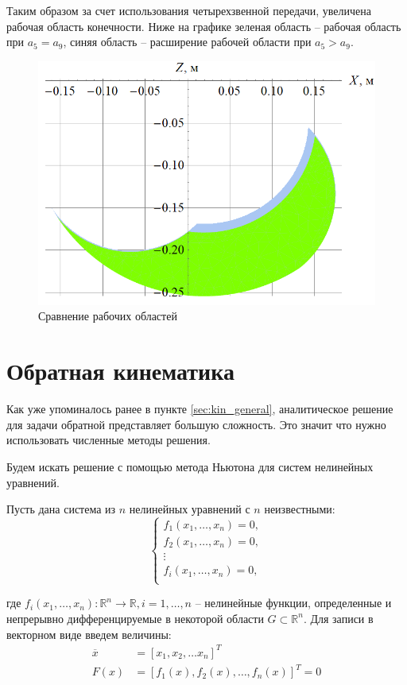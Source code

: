 Таким образом за счет использования четырехзвенной передачи, увеличена рабочая область конечности. Ниже на графике зеленая область -- рабочая область при $ a_5 = a_9 $, синяя область -- расширение рабочей области при $ a_5 > a_9 $.
\begin{figure}[h]
    \centering
    \includegraphics[scale=0.8]{chapter_kinematics/figure7.png}
    \caption{Сравнение рабочих областей}
    \label{}
\end{figure}

\section{Обратная кинематика} \label{sec:inverse_kin}
Как уже упоминалось ранее в пункте \ref{sec:kin_general}, аналитическое решение для задачи обратной представляет большую сложность. Это значит что нужно использовать численные методы решения.

Будем искать решение с помощью метода Ньютона для систем нелинейных уравнений.

Пусть дана система из $ n $ нелинейных уравнений с $ n $ неизвестными:
\[
\left\{ 
\begin{array}{c}
    f_1(x_1, \dots, x_n) = 0, \\
    f_2(x_1, \dots, x_n) = 0, \\
    \vdots \\
    f_i(x_1, \dots, x_n) = 0, \\
\end{array} 
\right.
\]

\noindent где $ f_i(x_1,\dots,x_n): \mathbb{R}^n \rightarrow \mathbb{R}, i=1,\dots, n $ -- нелинейные функции, определенные и непрерывно дифференцируемые в некоторой области $ G \subset \mathbb{R}^n $. Для записи в векторном виде введем величины:
\begin{align*}
    \overline{x} &= [x_1, x_2, \dots x_n]^T \\
    F(x) &= [f_1(x), f_2(x),\dots,f_n(x)]^T = 0
\end{align*}

